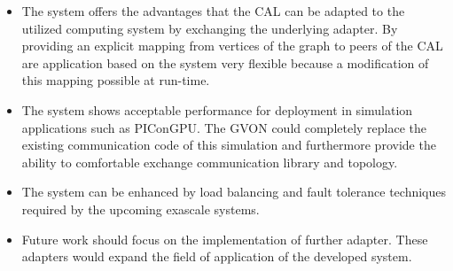 \begin{itemize}
\item  The system offers the advantages that the CAL can be adapted to the utilized
  computing system by exchanging the underlying adapter. By providing
  an explicit mapping from vertices of the graph to peers of the CAL
  are application based on the system very flexible because a
  modification of this mapping possible at run-time.

\item The system shows acceptable performance for deployment in
  simulation applications such as PIConGPU. The GVON could completely
  replace the existing communication code of this simulation and
  furthermore provide the ability to comfortable exchange
  communication library and topology.

\item The system can be enhanced by load balancing and fault
  tolerance techniques required by the upcoming exascale systems.

\item Future work should focus on the implementation of further
  adapter. These adapters would expand the field of application
  of the developed system. 
  
\end{itemize}

\cleardoublepage

